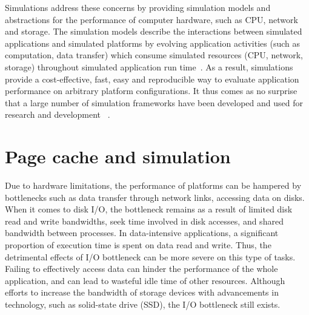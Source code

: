 Simulations address these concerns by providing simulation models and 
abstractions for the performance of computer hardware, such as CPU, 
network and storage. 
The simulation models describe the interactions between simulated applications 
and simulated platforms by evolving application activities (such as computation, 
data transfer) which consume simulated resources (CPU, network, storage) 
throughout simulated application run time~\cite{casanova2014simgrid}. 
As a result, simulations provide a cost-effective, fast, easy and reproducible 
way to evaluate application performance on arbitrary platform configurations. 
It thus comes as no surprise that a large number of simulation frameworks 
have been developed and used for research and development
~\cite{ optorsim, gridsim, groudsim, cloudsim, nunez2012simcan,
nunez2012icancloud, mdcsim, dissect_cf, cloudnetsimplusplus, 
fognetsimplusplus, casanova2014simgrid, ROSS, casanova2020fgcs}. 

\section{Page cache and simulation}

Due to hardware limitations, the performance of platforms can be hampered by 
bottlenecks such as data transfer through network links, accessing data on disks. 
When it comes to disk I/O, the bottleneck remains as a result of limited disk read 
and write bandwidths, seek time involved in disk accesses, and shared bandwidth 
between processes. 
In data-intensive applications, a significant proportion of execution time is spent 
on data read and write.
Thus, the detrimental effects of I/O bottleneck can be more severe on this type 
of tasks. 
Failing to effectively access data can hinder the performance of the whole application, 
and can lead to wasteful idle time of other resources. 
Although efforts to increase the bandwidth of storage devices with 
advancements in technology, such as solid-state drive (SSD), the I/O bottleneck 
still exists.

